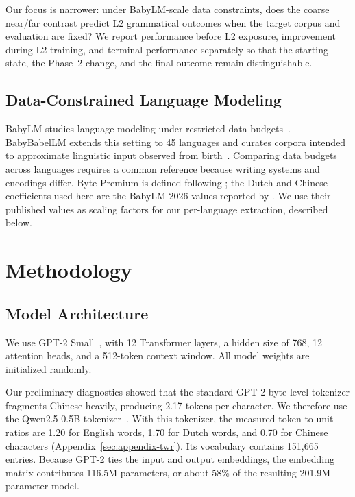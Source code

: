 \documentclass[11pt]{article}
\begin{document}
Our focus is narrower: under BabyLM-scale data constraints, does the coarse near/far contrast predict L2 grammatical outcomes when the target corpus and evaluation are fixed? We report performance before L2 exposure, improvement during L2 training, and terminal performance separately so that the starting state, the Phase~2 change, and the final outcome remain distinguishable.

\subsection{Data-Constrained Language Modeling}
BabyLM studies language modeling under restricted data budgets~\citep{choshen2026babylmturns4goes}. BabyBabelLM extends this setting to 45 languages and curates corpora intended to approximate linguistic input observed from birth~\citep{jumelet-etal-2026-babybabellm}. Comparing data budgets across languages requires a common reference because writing systems and encodings differ. Byte Premium is defined following \citet{arnett-etal-2024-bit}; the Dutch and Chinese coefficients used here are the BabyLM 2026 values reported by \citep{choshen2026babylmturns4goes}. We use their published values as scaling factors for our per-language extraction, described below.

\section{Methodology}

\subsection{Model Architecture}
We use GPT-2 Small~\citep{Radford2019LanguageMA}, with 12 Transformer layers, a hidden size of 768, 12 attention heads, and a 512-token context window. All model weights are initialized randomly.

Our preliminary diagnostics showed that the standard GPT-2 byte-level tokenizer fragments Chinese heavily, producing 2.17 tokens per character. We therefore use the Qwen2.5-0.5B tokenizer~\citep{qwen2025qwen25technicalreport}. With this tokenizer, the measured token-to-unit ratios are 1.20 for English words, 1.70 for Dutch words, and 0.70 for Chinese characters (Appendix~\ref{sec:appendix-twr}). Its vocabulary contains 151,665 entries. Because GPT-2 ties the input and output embeddings, the embedding matrix contributes 116.5M parameters, or about 58\% of the resulting 201.9M-parameter model.
\end{document}
